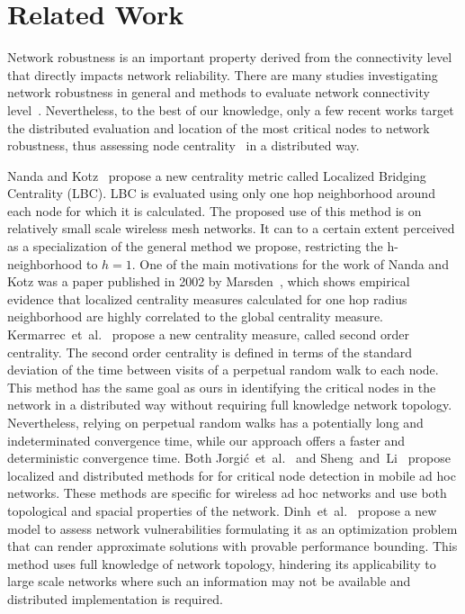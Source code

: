 \documentclass[conference,fleqn]{IEEEtran}
\begin{document}
\section{Related Work}
\label{sec:RelW}

Network robustness is an important property derived from the connectivity level
that directly impacts network reliability. There are many studies investigating
network robustness in general and methods to evaluate network connectivity level~\cite{Albert2000a,Newman2000,Kim2004}.
Nevertheless, to the best of our knowledge, only a few recent works target the distributed evaluation and location of the most critical nodes to network robustness, thus assessing node centrality~\cite{Nanda2008,Kermarrec2011,Dinh2010} in a distributed way.

Nanda and Kotz~\cite{Nanda2008} propose a new centrality metric called 
Localized Bridging Centrality (LBC). LBC is evaluated using only one hop neighborhood around 
each node for which it is calculated. The proposed use of this method is on relatively small scale wireless mesh networks. It can 
to a certain extent perceived as a specialization of the general method we propose, restricting the h-neighborhood to $h=1$.
One of the main motivations for the work of Nanda and Kotz 
was a paper published in 2002 by Marsden~\cite{Marsden2002}, which shows empirical evidence 
that localized centrality measures calculated for one hop radius neighborhood are highly correlated to the global centrality measure.  
Kermarrec~et~al.~\cite{Kermarrec2011} propose a new centrality measure, called second order centrality.
The second order centrality is defined in terms of the standard deviation of the time between visits of a perpetual random walk to each node.
This method has the same goal as ours in identifying the critical nodes in the network in a distributed way without requiring full knowledge 
network topology. Nevertheless, relying on perpetual random walks has a potentially long and indeterminated convergence 
time, while our approach offers a faster and deterministic convergence time.
Both Jorgi\'{c}~et~al.~\cite{Jorgic2004} and Sheng~and~Li~\cite{Sheng2006} propose localized and distributed methods for for critical 
node detection in mobile ad hoc networks. These methods are specific for wireless ad hoc networks and use both topological and
spacial properties of the network.
Dinh~et~al.~\cite{Dinh2010} propose a new model to assess network vulnerabilities formulating it as an optimization problem
that can render approximate solutions with provable performance bounding. This method uses full knowledge of network topology, hindering its
applicability to large scale networks where such an information may not be available and distributed implementation is required.
\end{document}
